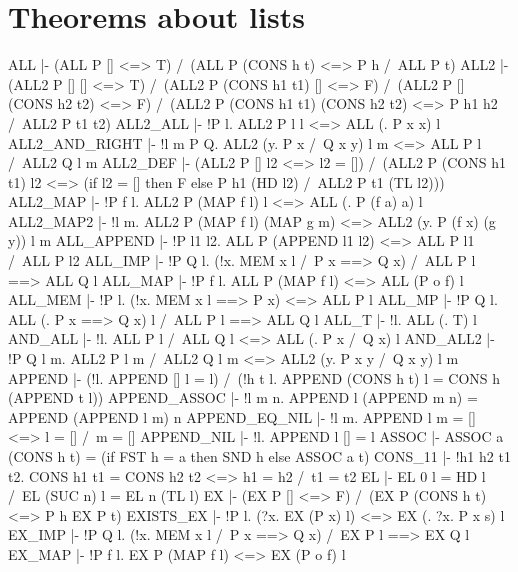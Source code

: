 \section{Theorems about lists}
\THEOREM ALL
  |- (ALL P [] <=> T) /\ (ALL P (CONS h t) <=> P h /\ ALL P t)
\ENDTHEOREM
\THEOREM ALL2
  |- (ALL2 P [] [] <=> T) /\
     (ALL2 P (CONS h1 t1) [] <=> F) /\
     (ALL2 P [] (CONS h2 t2) <=> F) /\
     (ALL2 P (CONS h1 t1) (CONS h2 t2) <=> P h1 h2 /\ ALL2 P t1 t2)
\ENDTHEOREM
\THEOREM ALL2\_ALL
  |- !P l. ALL2 P l l <=> ALL (\x. P x x) l
\ENDTHEOREM
\THEOREM ALL2\_AND\_RIGHT
  |- !l m P Q. ALL2 (\x y. P x /\ Q x y) l m <=> ALL P l /\ ALL2 Q l m
\ENDTHEOREM
\THEOREM ALL2\_DEF
  |- (ALL2 P [] l2 <=> l2 = []) /\
     (ALL2 P (CONS h1 t1) l2 <=>
      (if l2 = [] then F else P h1 (HD l2) /\ ALL2 P t1 (TL l2)))
\ENDTHEOREM
\THEOREM ALL2\_MAP
  |- !P f l. ALL2 P (MAP f l) l <=> ALL (\a. P (f a) a) l
\ENDTHEOREM
\THEOREM ALL2\_MAP2
  |- !l m. ALL2 P (MAP f l) (MAP g m) <=> ALL2 (\x y. P (f x) (g y)) l m
\ENDTHEOREM
\THEOREM ALL\_APPEND
  |- !P l1 l2. ALL P (APPEND l1 l2) <=> ALL P l1 /\ ALL P l2
\ENDTHEOREM
\THEOREM ALL\_IMP
  |- !P Q l. (!x. MEM x l /\ P x ==> Q x) /\ ALL P l ==> ALL Q l
\ENDTHEOREM
\THEOREM ALL\_MAP
  |- !P f l. ALL P (MAP f l) <=> ALL (P o f) l
\ENDTHEOREM
\THEOREM ALL\_MEM
  |- !P l. (!x. MEM x l ==> P x) <=> ALL P l
\ENDTHEOREM
\THEOREM ALL\_MP
  |- !P Q l. ALL (\x. P x ==> Q x) l /\ ALL P l ==> ALL Q l
\ENDTHEOREM
\THEOREM ALL\_T
  |- !l. ALL (\x. T) l
\ENDTHEOREM
\THEOREM AND\_ALL
  |- !l. ALL P l /\ ALL Q l <=> ALL (\x. P x /\ Q x) l
\ENDTHEOREM
\THEOREM AND\_ALL2
  |- !P Q l m. ALL2 P l m /\ ALL2 Q l m <=> ALL2 (\x y. P x y /\ Q x y) l m
\ENDTHEOREM
\THEOREM APPEND
  |- (!l. APPEND [] l = l) /\
     (!h t l. APPEND (CONS h t) l = CONS h (APPEND t l))
\ENDTHEOREM
\THEOREM APPEND\_ASSOC
  |- !l m n. APPEND l (APPEND m n) = APPEND (APPEND l m) n
\ENDTHEOREM
\THEOREM APPEND\_EQ\_NIL
  |- !l m. APPEND l m = [] <=> l = [] /\ m = []
\ENDTHEOREM
\THEOREM APPEND\_NIL
  |- !l. APPEND l [] = l
\ENDTHEOREM
\THEOREM ASSOC
  |- ASSOC a (CONS h t) = (if FST h = a then SND h else ASSOC a t)
\ENDTHEOREM
\THEOREM CONS\_11
  |- !h1 h2 t1 t2. CONS h1 t1 = CONS h2 t2 <=> h1 = h2 /\ t1 = t2
\ENDTHEOREM
\THEOREM EL
  |- EL 0 l = HD l /\ EL (SUC n) l = EL n (TL l)
\ENDTHEOREM
\THEOREM EX
  |- (EX P [] <=> F) /\ (EX P (CONS h t) <=> P h \/ EX P t)
\ENDTHEOREM
\THEOREM EXISTS\_EX
  |- !P l. (?x. EX (P x) l) <=> EX (\s. ?x. P x s) l
\ENDTHEOREM
\THEOREM EX\_IMP
  |- !P Q l. (!x. MEM x l /\ P x ==> Q x) /\ EX P l ==> EX Q l
\ENDTHEOREM
\THEOREM EX\_MAP
  |- !P f l. EX P (MAP f l) <=> EX (P o f) l
